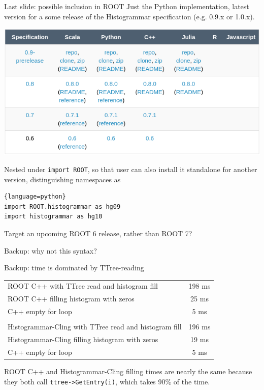 \documentclass{beamer}
\begin{document}
\begin{frame}[fragile]{Last slide: possible inclusion in ROOT}
\vspace{0.25 cm}
Just the Python implementation, latest version for a some release of the Histogrammar specification (e.g. 0.9.x or 1.0.x).

\begin{center}
\includegraphics[width=0.75\linewidth]{release_matrix.png}
\end{center}

Nested under {\tt\small import ROOT}, so that user can also install it standalone for another version, distinguishing namespaces as

\hfill\begin{minipage}{0.95\linewidth}
\begin{lstlisting}{language=python}
import ROOT.histogrammar as hg09
import histogrammar as hg10
\end{lstlisting}
\end{minipage}

\vfill
Target an upcoming ROOT 6 release, rather than ROOT 7?
\end{frame}

\begin{frame}{Backup: why not this syntax?}





\end{frame}

\begin{frame}{Backup: time is dominated by TTree-reading}
\vspace{0.5 cm}
\renewcommand{\arraystretch}{1.2}
\begin{tabular}{l c}
ROOT C++ with TTree read and histogram fill & 198 ms \\
ROOT C++ filling histogram with zeros & 25 ms \\
C++ empty for loop & 5 ms \\
 & \\
Histogrammar-Cling with TTree read and histogram fill & 196 ms \\
Histogrammar-Cling filling histogram with zeros & 19 ms \\
C++ empty for loop & 5 ms \\
\end{tabular}

\vspace{1 cm}
ROOT C++ and Histogrammar-Cling filling times are nearly the same because they both call {\tt\small ttree->GetEntry(i)}, which takes 90\% of the time.
\end{frame}
\end{document}

